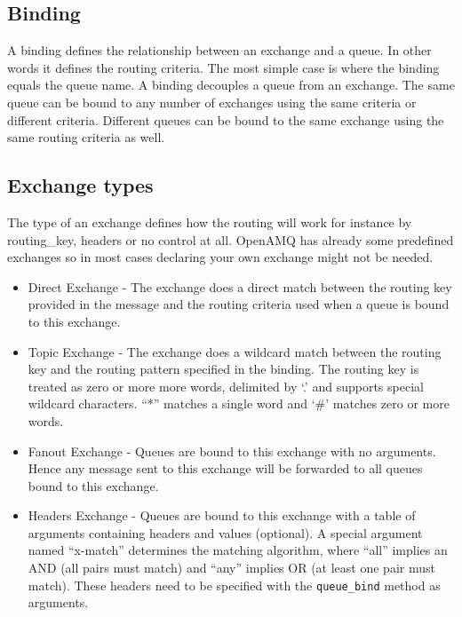 \documentclass[a4paper,twoside]{article}
\begin{document}
\subsection{Binding}

A binding defines the relationship between an 
exchange and a queue. In other words it defines 
the routing criteria. The most simple case is where 
the binding equals the queue name. A binding 
decouples a queue from an exchange. The same 
queue can be bound to any number of exchanges 
using the same criteria or different criteria. 
Different queues can be bound to the same exchange 
using the same routing criteria as well.



\subsection{Exchange types}

The type of an exchange defines how the routing
will work for instance by routing\_key, headers
or no control at all. OpenAMQ has already some 
predefined exchanges so in most cases declaring 
your own exchange might not be
needed. 

\begin{itemize}
  \item Direct Exchange  - 
    The exchange does a direct  match between 
    the routing key provided in the 
    message and the routing criteria used when a 
    queue is bound to this exchange.    
  \item Topic Exchange  - 
    The exchange does a wildcard 
    match between the routing key and the routing 
    pattern specified in the binding. The routing 
    key is treated as zero or more more words, 
    delimited by ‘.’ and supports special wildcard 
    characters. “*” matches a single word and 
    ‘\#’ matches zero or more words.
  \item Fanout Exchange  - 
    Queues are bound to this 
    exchange with no arguments. Hence any message 
    sent to this exchange will be forwarded to all 
    queues bound to this exchange.
  \item Headers Exchange  - 
    Queues are bound to this 
    exchange with a table of arguments containing 
    headers and values (optional). A special argument 
    named “x-match” determines the matching algorithm, 
    where “all” implies an AND (all pairs must match) 
    and “any” implies OR (at least one pair must match).
    These headers need to be specified with the {\tt queue\_bind}
    method as arguments.
\end{itemize}
\end{document}
